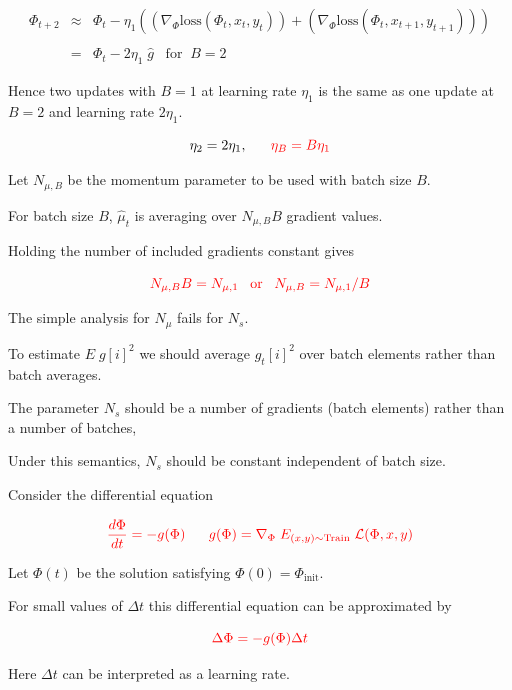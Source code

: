 {\vfill
\begin{eqnarray*}
  \Phi_{t+2} & \approx & \Phi_t - \eta_1((\nabla_\Phi \mathrm{loss}(\Phi_t,x_t,y_t)) + (\nabla_\Phi \mathrm{loss}(\Phi_t,x_{t+1},y_{t+1}))) \\
  \\
  & = & \Phi_t - 2\eta_1\;\hat{g}\;\;\;\mathrm{for}\;\;B=2
\end{eqnarray*}

\vfill
Hence two updates with $B=1$ at learning rate $\eta_1$ is the same as one update at $B=2$ and learning rate $2\eta_1$.

\vfill
$$\eta_2 = 2\eta_1,\;\;\;\;\;\;{\color{red} \eta_B = B\eta_1}$$


Let $N_{\mu,B}$ be the momentum parameter to be used with batch size $B$.

\vfill
For batch size $B$, $\hat{\mu}_t$ is averaging over $N_{\mu,B}B$ gradient values.

\vfill
Holding the number of included gradients constant gives

\vfill
$${\color{red} N_{\mu,B}B = N_{\mu,1}\;\;\;\mbox{or}\;\;\;N_{\mu,B} = N_{\mu,1}/B}$$


The simple analysis for $N_{\mu}$ fails for $N_s$.

\vfill
To estimate $E\;g[i]^2$ we should average $\hat{g}_t[i]^2$ over batch elements rather than batch averages.

\vfill
The parameter $N_s$ should be a number of gradients (batch elements) rather than a number of batches,

\vfill Under this semantics, $N_s$ should be constant independent of batch size.


Consider the differential equation

$${\color{red} \frac{d \Phi}{d t} = - g(\Phi) \;\;\;\;\;\; g(\Phi) = \nabla_\Phi\; E_{(x,y) \sim \mathrm{Train}}\;{\cal L}(\Phi,x,y)}$$

\vfill
Let $\Phi(t)$ be the solution satisfying $\Phi(0) = \Phi_{\mathrm{init}}$.

\vfill
For small values of $\Delta t$ this differential equation can be approximated by

\vfill
$${\color{red} \Delta \Phi = - g(\Phi)\Delta t}$$

\vfill
Here $\Delta t$ can be interpreted as a learning rate.

}
